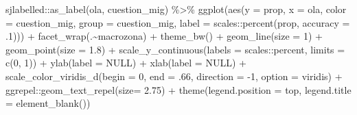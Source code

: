\documentclass[
  12pt,
]{book}
\newenvironment{Shaded}{\begin{snugshade}}{\end{snugshade}}
\newcommand{\AttributeTok}[1]{\textcolor[rgb]{0.77,0.63,0.00}{#1}}
\newcommand{\ConstantTok}[1]{\textcolor[rgb]{0.00,0.00,0.00}{#1}}
\newcommand{\DecValTok}[1]{\textcolor[rgb]{0.00,0.00,0.81}{#1}}
\newcommand{\FloatTok}[1]{\textcolor[rgb]{0.00,0.00,0.81}{#1}}
\newcommand{\FunctionTok}[1]{\textcolor[rgb]{0.00,0.00,0.00}{#1}}
\newcommand{\NormalTok}[1]{#1}
\newcommand{\SpecialCharTok}[1]{\textcolor[rgb]{0.00,0.00,0.00}{#1}}
\newcommand{\StringTok}[1]{\textcolor[rgb]{0.31,0.60,0.02}{#1}}
\begin{document}
\begin{Shaded}
\begin{Highlighting}[]
\NormalTok{  sjlabelled}\SpecialCharTok{::}\FunctionTok{as\_label}\NormalTok{(ola, cuestion\_mig) }\SpecialCharTok{\%\textgreater{}\%} 
  \FunctionTok{ggplot}\NormalTok{(}\FunctionTok{aes}\NormalTok{(}\AttributeTok{y =}\NormalTok{ prop, }\AttributeTok{x =}\NormalTok{ ola, }\AttributeTok{color =}\NormalTok{ cuestion\_mig, }\AttributeTok{group =}\NormalTok{ cuestion\_mig,}
             \AttributeTok{label =}\NormalTok{ scales}\SpecialCharTok{::}\FunctionTok{percent}\NormalTok{(prop, }\AttributeTok{accuracy =}\NormalTok{ .}\DecValTok{1}\NormalTok{))) }\SpecialCharTok{+}
  \FunctionTok{facet\_wrap}\NormalTok{(.}\SpecialCharTok{\textasciitilde{}}\NormalTok{macrozona) }\SpecialCharTok{+}
  \FunctionTok{theme\_bw}\NormalTok{() }\SpecialCharTok{+}   
  \FunctionTok{geom\_line}\NormalTok{(}\AttributeTok{size =} \DecValTok{1}\NormalTok{) }\SpecialCharTok{+}
  \FunctionTok{geom\_point}\NormalTok{(}\AttributeTok{size =} \FloatTok{1.8}\NormalTok{) }\SpecialCharTok{+}
  \FunctionTok{scale\_y\_continuous}\NormalTok{(}\AttributeTok{labels =}\NormalTok{ scales}\SpecialCharTok{::}\NormalTok{percent,}
                     \AttributeTok{limits =} \FunctionTok{c}\NormalTok{(}\DecValTok{0}\NormalTok{, }\DecValTok{1}\NormalTok{)) }\SpecialCharTok{+}
  \FunctionTok{ylab}\NormalTok{(}\AttributeTok{label =} \ConstantTok{NULL}\NormalTok{) }\SpecialCharTok{+}
  \FunctionTok{xlab}\NormalTok{(}\AttributeTok{label =} \ConstantTok{NULL}\NormalTok{) }\SpecialCharTok{+}
  \FunctionTok{scale\_color\_viridis\_d}\NormalTok{(}\AttributeTok{begin =} \DecValTok{0}\NormalTok{, }\AttributeTok{end =}\NormalTok{ .}\DecValTok{66}\NormalTok{, }\AttributeTok{direction =} \SpecialCharTok{{-}}\DecValTok{1}\NormalTok{, }\AttributeTok{option =} \StringTok{\textquotesingle{}viridis\textquotesingle{}}\NormalTok{) }\SpecialCharTok{+}
\NormalTok{  ggrepel}\SpecialCharTok{::}\FunctionTok{geom\_text\_repel}\NormalTok{(}\AttributeTok{size=} \FloatTok{2.75}\NormalTok{) }\SpecialCharTok{+}
  \FunctionTok{theme}\NormalTok{(}\AttributeTok{legend.position =} \StringTok{\textquotesingle{}top\textquotesingle{}}\NormalTok{,}
        \AttributeTok{legend.title =} \FunctionTok{element\_blank}\NormalTok{())}
\end{Highlighting}
\end{Shaded}
\end{document}
